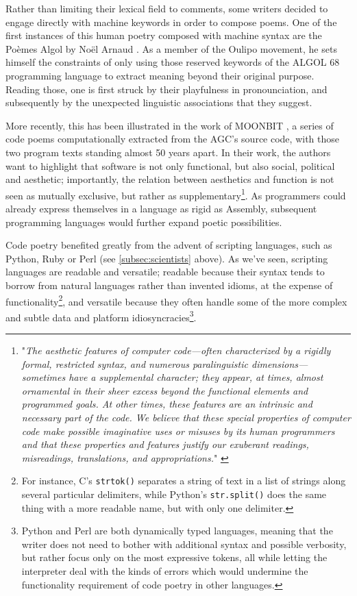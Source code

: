 Rather than limiting their lexical field to comments, some writers decided to engage directly with machine keywords in order to compose poems. One of the first instances of this human poetry composed with machine syntax are the Poèmes Algol by Noël Arnaud \citep{arnaud_poemes_1968}. As a member of the Oulipo movement, he sets himself the constraints of only using those reserved keywords of the ALGOL 68 programming language to extract meaning beyond their original purpose. Reading those, one is first struck by their playfulness in pronounciation, and subsequently by the unexpected linguistic associations that they suggest.

More recently, this has been illustrated in the work of MOONBIT \citep{mosteirin_moonbit_2019}, a series of code poems computationally extracted from the AGC's source code, with those two program texts standing almost 50 years apart. In their work, the authors want to highlight that software is not only functional, but also social, political and aesthetic; importantly, the relation between aesthetics and function is not seen as mutually exclusive, but rather as supplementary\footnote{"\emph{The aesthetic features of computer code—often characterized by a rigidly formal, restricted syntax, and numerous paralinguistic dimensions—sometimes have a supplemental character; they appear, at times, almost ornamental in their sheer excess beyond the functional elements and programmed goals. At other times, these features are an intrinsic and necessary part of the code. We believe that these special properties of computer code make possible imaginative uses or misuses by its human programmers and that these properties and features justify our exuberant readings, misreadings, translations, and appropriations.}" \citep{mosteirin_moonbit_2019}}. As programmers could already express themselves in a language as rigid as Assembly, subsequent programming languages would further expand poetic possibilities.

Code poetry benefited greatly from the advent of scripting languages, such as Python, Ruby or Perl (see \autoref{subsec:scientists} above). As we've seen, scripting languages are readable and versatile; readable because their syntax tends to borrow from natural languages rather than invented idioms, at the expense of functionality\footnote{For instance, C's \lstinline{strtok()} separates a string of text in a list of strings along several particular delimiters, while Python's \lstinline{str.split()} does the same thing with a more readable name, but with only one delimiter.}, and versatile because they often handle some of the more complex and subtle data and platform idiosyncracies\footnote{Python and Perl are both dynamically typed languages, meaning that the writer does not need to bother with additional syntax and possible verbosity, but rather focus only on the most expressive tokens, all while letting the interpreter deal with the kinds of errors which would undermine the functionality requirement of code poetry in other languages.}.

